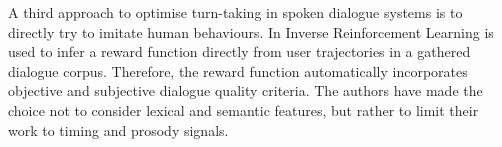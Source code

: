 	A third approach to optimise turn-taking in spoken dialogue systems is to directly try to imitate human behaviours. In \cite{Kim2014} Inverse Reinforcement Learning is used to infer a reward function directly from user trajectories in a gathered dialogue corpus. Therefore, the reward function automatically incorporates objective and subjective dialogue quality criteria. The authors have made the choice not to consider lexical and semantic features, but rather to limit their work to timing and prosody signals.
	

